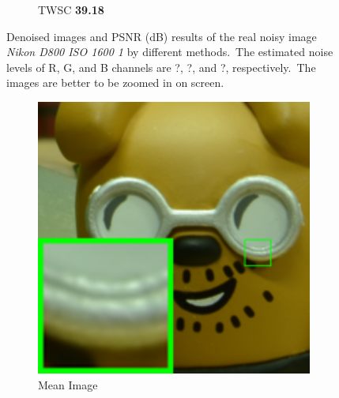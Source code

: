 \begin{figure}
\begin{subfigure}[t]{0.19\textwidth}
		\caption{TWSC \textbf{39.18}}
    \end{subfigure}
    \caption{Denoised images and PSNR (dB) results of the real noisy image \textsl{Nikon D800 ISO 1600 1} \cite{crosschannel2016} by different methods.\ The estimated noise levels of R, G, and B channels are ?, ?, and ?, respectively.\ The images are better to be zoomed in on screen.}
    \label{fig3}
\end{figure}


\begin{figure}
    \centering
    \begin{subfigure}[t]{0.19\textwidth}
        \centering
        \includegraphics[width=1\textwidth]{images/twsc/cc/resize_br_Mean_d800_iso3200_1_real.png}
		\caption{Mean Image}
    \end{subfigure}
    \hfill
    \begin{subfigure}[t]{0.19\textwidth}
        \centering

\end{subfigure}
\end{figure}
